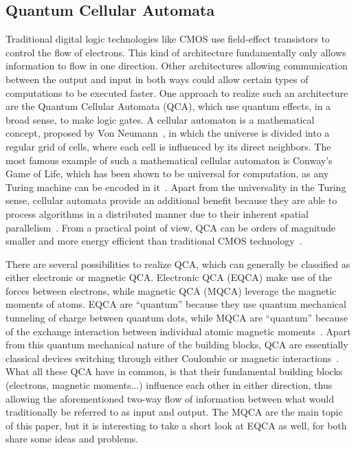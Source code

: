 \documentclass[11pt,a4paper,english]{article}
\begin{document}
\subsection{Quantum Cellular Automata}
Traditional digital logic technologies like CMOS use field-effect transistors to control the flow of electrons. This kind of architecture fundamentally only allows information to flow in one direction. Other architectures allowing communication between the output and input in both ways could allow certain types of computations to be executed faster. One approach to realize such an architecture are the Quantum Cellular Automata (QCA), which use quantum effects, in a broad sense, to make logic gates. A cellular automaton is a mathematical concept, proposed by Von Neumann~\cite{Sideinfo_SelfRepAutomata}, in which the universe is divided into a regular grid of cells, where each cell is influenced by its direct neighbors. The most famous example of such a mathematical cellular automaton is Conway's Game of Life, which has been shown to be universal for computation, as any Turing machine can be encoded in it~\cite{QCA_GameOfLife}. Apart from the universality in the Turing sense, cellular automata provide an additional benefit because they are able to process algorithms in a distributed manner due to their inherent spatial parallelism~\cite{QCA_GameOfLife}. From a practical point of view, QCA can be orders of magnitude smaller and more energy efficient than traditional CMOS technology~\cite{MQCA_RoomTemp}. \par
There are several possibilities to realize QCA, which can generally be classified as either electronic or magnetic QCA. Electronic QCA (EQCA) make use of the forces between electrons, while magnetic QCA (MQCA) leverage the magnetic moments of atoms. EQCA are ``quantum'' because they use quantum mechanical tunneling of charge between quantum dots, while MQCA are ``quantum'' because of the exchange interaction between individual atomic magnetic moments~\cite{MQCA_RoomTemp}. Apart from this quantum mechanical nature of the building blocks, QCA are essentially classical devices switching through either Coulombic or magnetic interactions~\cite{QCA_Algorithms}. What all these QCA have in common, is that their fundamental building blocks (electrons, magnetic moments...) influence each other in either direction, thus allowing the aforementioned two-way flow of information between what would traditionally be referred to as input and output. The MQCA are the main topic of this paper, but it is interesting to take a short look at EQCA as well, for both share some ideas and problems. \par
\end{document}
